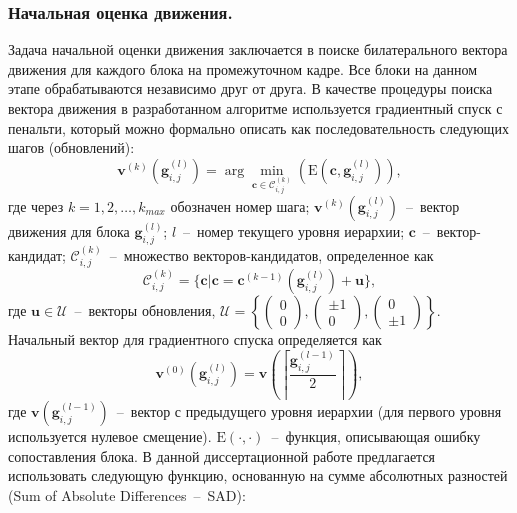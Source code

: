 \subsubsection{Начальная оценка движения.}
\label{chap2:4:1:2}

Задача начальной оценки движения заключается в поиске билатерального вектора движения для каждого блока на промежуточном кадре. Все блоки на данном этапе обрабатываются независимо друг от друга. В качестве процедуры поиска вектора движения в разработанном алгоритме используется градиентный спуск с пенальти, который можно формально описать как последовательность следующих шагов (обновлений):
\begin{equation*}
 \mathbf{v}^{(k)}(\mathbf{g}_{i,j}^{(l)}) = \arg\min_{\mathbf{c} \in \mathcal{C}_{i,j}^{(k)}} (\mathrm{E}(\mathbf{c},\mathbf{g}_{i,j}^{(l)})),
\end{equation*}
где через $k=1, 2,\ldots, k_{max}$ обозначен номер шага; $\mathbf{v}^{(k)}(\mathbf{g}_{i,j}^{(l)})$~--~вектор движения для блока $\mathbf{g}_{i,j}^{(l)}$; $l$~--~номер текущего уровня иерархии; $\mathbf{c}$~--~вектор-кандидат; $\mathcal{C}_{i,j}^{(k)}$~--~множество векторов-кандидатов, определенное как
\begin{equation*}
\mathcal{C}_{i,j}^{(k)} = \lbrace \mathbf{c} \vert \mathbf{c} = \mathbf{c}^{(k-1)}(\mathbf{g}_{i,j}^{(l)})+\mathbf{u} \rbrace,
\end{equation*}
где $\mathbf{u} \in \mathcal{U}$~--~векторы обновления, $\mathcal{U}=\left\lbrace\begin{pmatrix}0\\0\end{pmatrix},\begin{pmatrix}\pm1\\0\end{pmatrix},\begin{pmatrix}0\\\pm1\end{pmatrix}\right\rbrace$.
Начальный вектор для градиентного спуска определяется как
\begin{equation*}
\mathbf{v}^{(0)}(\mathbf{g}_{i,j}^{(l)}) = \mathbf{v}\left(\left\lceil\frac{\mathbf{g}_{i,j}^{(l-1)}}{2}\right\rceil\right),
\end{equation*}
где $\mathbf{v}(\mathbf{g}_{i,j}^{(l-1)})$~--~вектор с предыдущего уровня иерархии (для первого уровня используется нулевое смещение). $\mathrm{E}(\cdot,\cdot)$~--~функция, описывающая ошибку сопоставления блока. В данной диссертационной работе предлагается использовать следующую функцию, основанную на сумме абсолютных разностей (Sum of Absolute Differences~--~SAD):
